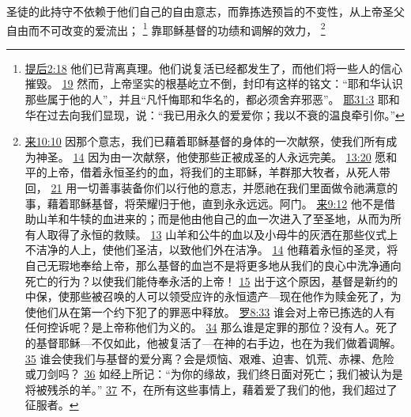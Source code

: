 \documentclass[12pt, a4paper, oneside]{ctexart}
\newcounter{parnum}[section]
\newcommand{\N}{%
   \noindent\refstepcounter{parnum}%
    \makebox[\parindent][l]{\textbf{\arabic{parnum}.}}}
\begin{document}
\N 圣徒的此持守不依赖于他们自己的自由意志，而靠拣选预旨的不变性，从上帝圣父自由而不可改变的爱流出；
	\footnote {
		\href{https://biblehub.com/2_timothy/2-18.htm}{提后2:18} 他们已背离真理。他们说复活已经都发生了，而他们将一些人的信心摧毁。
		\href{https://biblehub.com/2_timothy/2-19.htm}{19} 然而，上帝坚实的根基屹立不倒，封印有这样的铭文：“耶和华认识那些属于他的人”，并且“凡忏悔耶和华名的，都必须舍弃邪恶”。
		\href{https://biblehub.com/jeremiah/31-3.htm}{耶31:3} 耶和华在过去向我们显现，说：“我已用永久的爱爱你；我以不衰的温良牵引你。”
	}
	靠耶稣基督的功绩和调解的效力，
	\footnote {
		\href{https://biblehub.com/hebrews/10-10.htm}{来10:10} 因那个意志，我们已藉着耶稣基督的身体的一次献祭，使我们所有成为神圣。
		\href{https://biblehub.com/hebrews/10-14.htm}{14} 因为由一次献祭，他使那些正被成圣的人永远完美。
		\href{https://biblehub.com/hebrews/13-20.htm}{13:20} 愿和平的上帝，借着永恒圣约的血，将我们的主耶稣，羊群那大牧者，从死人带回，
		\href{https://biblehub.com/hebrews/13-21.htm}{21} 用一切善事装备你们以行他的意志，并愿祂在我们里面做令祂满意的事，藉着耶稣基督，将荣耀归于他，直到永永远远。阿门。
		\href{https://biblehub.com/hebrews/9-12.htm}{来9:12} 他不是借助山羊和牛犊的血进来的；而是他由他自己的血一次进入了至圣地，从而为所有人取得了永恒的救赎。
		\href{https://biblehub.com/hebrews/9-13.htm}{13} 山羊和公牛的血以及小母牛的灰洒在那些仪式上不洁净的人上，使他们圣洁，以致他们外在洁净。
		\href{https://biblehub.com/hebrews/9-14.htm}{14} 他藉着永恒的圣灵，将自己无瑕地奉给上帝，那么基督的血岂不是将更多地从我们的良心中洗净通向死亡的行为？以使我们能侍奉永活的上帝！
		\href{https://biblehub.com/hebrews/9-15.htm}{15} 出于这个原因，基督是新约的中保，使那些被召唤的人可以领受应许的永恒遗产---现在他作为赎金死了，为使他们从在第一个约下犯了的罪恶中释放。
		\href{https://biblehub.com/romans/8-33.htm}{罗8:33} 谁会对上帝已拣选的人有任何控诉呢？是上帝称他们为义的。
		\href{https://biblehub.com/romans/8-34.htm}{34} 那么谁是定罪的那位？没有人。死了的基督耶稣---不仅如此，他被复活了---在神的右手边，也在为我们做着调解。
		\href{https://biblehub.com/romans/8-35.htm}{35} 谁会使我们与基督的爱分离？会是烦恼、艰难、迫害、饥荒、赤裸、危险或刀剑吗？
		\href{https://biblehub.com/romans/8-36.htm}{36} 如经上所记：“为你的缘故，我们终日面对死亡；我们被认为是将被残杀的羊。”
		\href{https://biblehub.com/romans/8-37.htm}{37} 不，在所有这些事情上，藉着爱了我们的他，我们超过了征服者。
}
\end{document}
